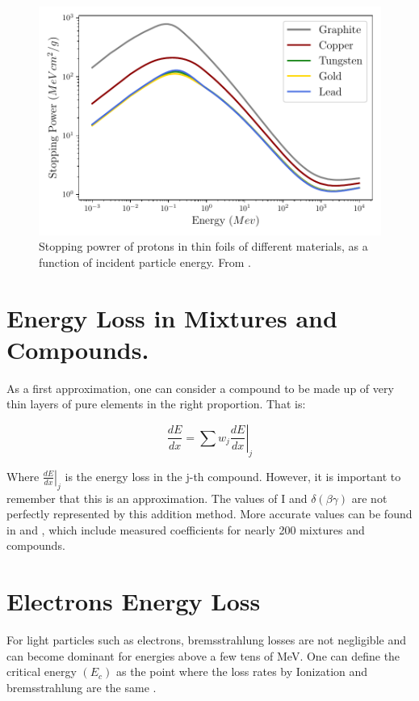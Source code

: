  \begin{figure}[h]
    \centering
    \includegraphics[width=0.7\columnwidth]{EdepMetal/EneDepMetal.pdf}
    \caption{Stopping powrer of protons in thin foils of different materials, as a function of incident particle energy. From \parencite*[][]{ref:NIST}.}
    \label{fig:EneDep}
\end{figure}

\section{Energy Loss in Mixtures and Compounds.}

As a first approximation, one can consider a compound to be made up of very thin layers of pure elements in the right proportion. That is: 

 \begin{equation}
    \frac{dE}{dx} =  \sum w_j \left.\frac{dE}{dx} \right\vert_j
 \end{equation}

Where $\left. \frac{dE}{dx}\right\vert_j$  is the energy loss in the j-th compound. However, it is important to remember that this is an approximation. The values of I and $\delta (\beta\gamma)$ are not perfectly represented by this addition method. More accurate values can be found in \parencite*[][]{ref:compound1} and \parencite*[][]{ref:compound2}, which include measured coefficients for nearly 200 mixtures and compounds. 

\section{Electrons Energy Loss}

For light particles such as electrons, bremsstrahlung losses are not negligible and can become dominant for energies above a few tens of \si[]{\mega\electronvolt}. One can define the critical energy $(E_c)$ as the point where the loss rates by Ionization and bremsstrahlung are the same \parencite*[][]{ref:EleCricEne}. 

